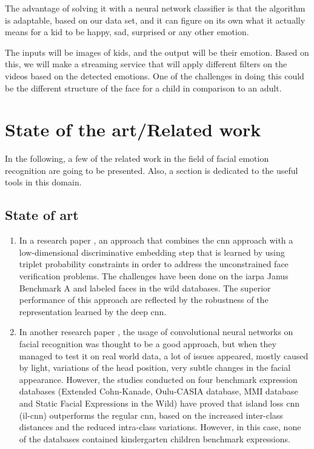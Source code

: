 \documentclass[runningheads,a4paper,11pt]{report}
\begin{document}
The advantage of solving it with a neural network classifier is that the algorithm is adaptable, based on our data set, and it can figure on its own what it actually means for a kid to be happy, sad, surprised or any other emotion.


The inputs will be images of kids, and the output will be their emotion. Based on this, we will make a streaming service that will apply different filters on the videos based on the detected emotions. One of the challenges in doing this could be the different structure of the face for a child in comparison to an adult.


\chapter{State of the art/Related work}
\label{chapter:stateOfArt}


In the following, a few of the related work in the field of facial emotion recognition are going to be presented. Also, a section is dedicated to the useful tools in this domain.

\section{State of art}
\begin{enumerate}
    \item In a research paper \cite{swami2017}, an approach that combines the \gls{cnn} approach with a low-dimensional discriminative embedding step that is learned by using triplet probability constraints in order to address the unconstrained face verification problems. The challenges have been done on the \gls{iarpa} Janus Benchmark A and labeled faces in the wild databases. The superior performance of this approach are reflected by the robustness of the representation learned by the deep \gls{cnn}.
    
    
    \item In another research paper \cite{caimeng2018}, the usage of convolutional neural networks on facial recognition was thought to be a good approach, but when they managed to test it on real world data, a lot of issues appeared, mostly caused by light, variations of the head position, very subtle changes in the facial appearance. However, the studies conducted on four benchmark expression databases (Extended Cohn-Kanade, Oulu-CASIA database, MMI database and Static Facial Expressions in the Wild) have proved that island loss \gls{cnn} (\gls{il-cnn}) outperforms the regular \gls{cnn}, based on the increased inter-class distances and the reduced intra-class variations. However, in this case, none of the databases contained kindergarten children benchmark expressions.
    
\end{enumerate}
\end{document}
